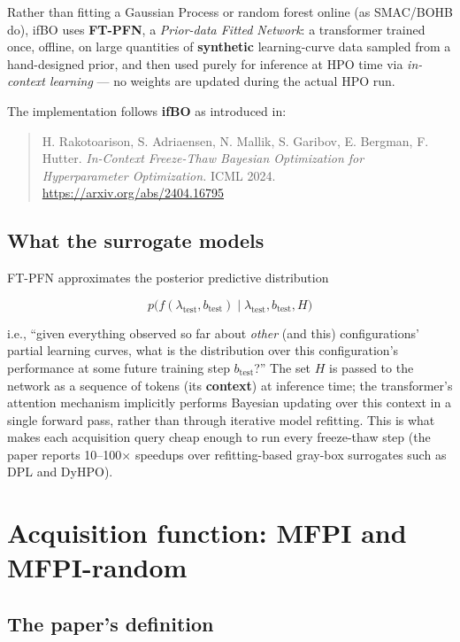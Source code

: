 \documentclass[10pt]{article}
\begin{document}
Rather than fitting a Gaussian Process or random forest online (as SMAC/BOHB do), ifBO
uses \textbf{FT-PFN}, a \textit{Prior-data Fitted Network}: a transformer trained once, offline, on
large quantities of \textbf{synthetic} learning-curve data sampled from a hand-designed
prior, and then used purely for inference at HPO time via \textit{in-context learning} — no
weights are updated during the actual HPO run.

The implementation follows \textbf{ifBO} as introduced in:
\begin{quote}
H. Rakotoarison, S. Adriaensen, N. Mallik, S. Garibov, E. Bergman, F. Hutter.
\emph{In-Context Freeze-Thaw Bayesian Optimization for Hyperparameter Optimization.}
ICML 2024. \url{https://arxiv.org/abs/2404.16795}
\end{quote}

\subsection*{What the surrogate models}

FT-PFN approximates the posterior predictive distribution

\begin{equation}
p\big( f(\lambda_\text{test}, b_\text{test}) \mid \lambda_\text{test}, b_\text{test}, H \big)
\end{equation}

i.e., ``given everything observed so far about \emph{other} (and this) configurations'
partial learning curves, what is the distribution over this configuration's performance
at some future training step $b_\text{test}$?'' The set $H$ is passed to the network as a sequence
of tokens (its \textbf{context}) at inference time; the transformer's attention mechanism
implicitly performs Bayesian updating over this context in a single forward pass,
rather than through iterative model refitting. This is what makes each acquisition
query cheap enough to run every freeze-thaw step (the paper reports 10--100$\times$ speedups
over refitting-based gray-box surrogates such as DPL and DyHPO).

\section*{Acquisition function: MFPI and MFPI-random}

\subsection*{The paper's definition}
\end{document}
